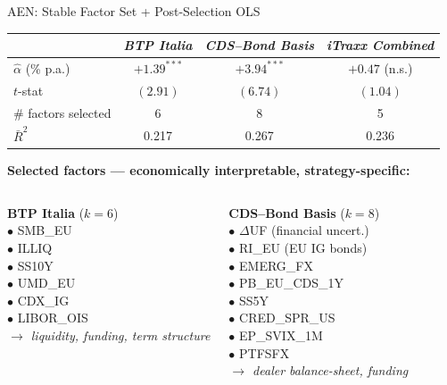 \documentclass[aspectratio=169,11pt]{beamer}
\newcommand{\hlt}[1]{\textcolor{edhecred}{\textbf{#1}}}     %
\begin{document}
\begin{frame}[t]{AEN: Stable Factor Set + Post-Selection OLS}
\centering
\scriptsize
\vspace{0.05cm}

\renewcommand{\arraystretch}{1.05}
\setlength{\tabcolsep}{6pt}

\begin{tabular}{lccc}
\toprule
 & \textit{BTP Italia} & \textit{CDS--Bond Basis} & \textit{iTraxx Combined} \\
\midrule
$\hat{\alpha}$ (\% p.a.)   & \hlt{$+1.39^{***}$} & \hlt{$+3.94^{***}$} & $+0.47$ (n.s.) \\
$t$-stat                   & $(2.91)$            & $(6.74)$            & $(1.04)$ \\
\# factors selected        & 6                   & 8                   & 5 \\
$\bar R^2$                 & 0.217               & 0.267               & 0.236 \\
\bottomrule
\end{tabular}

\vspace{0.30cm}

\textbf{Selected factors --- economically interpretable, strategy-specific:}\\[0.10cm]

\begin{columns}[t]
\textbf{BTP Italia} ($k=6$)\\[2pt]
\scriptsize
$\bullet$ SMB\_EU \\
$\bullet$ ILLIQ \\
$\bullet$ SS10Y \\
$\bullet$ UMD\_EU \\
$\bullet$ CDX\_IG \\
$\bullet$ LIBOR\_OIS \\[6pt]
\textcolor{myblue}{\textit{$\rightarrow$ liquidity, funding, term structure}}

\textbf{CDS--Bond Basis} ($k=8$)\\[2pt]
\scriptsize
$\bullet$ $\Delta$UF (financial uncert.) \\
$\bullet$ RI\_EU (EU IG bonds) \\
$\bullet$ EMERG\_FX \\
$\bullet$ PB\_EU\_CDS\_1Y \\
$\bullet$ SS5Y \\
$\bullet$ CRED\_SPR\_US \\
$\bullet$ EP\_SVIX\_1M \\
$\bullet$ PTFSFX \\[4pt]
\textcolor{myblue}{\textit{$\rightarrow$ dealer balance-sheet, funding}}


\end{columns}
\end{frame}
\end{document}
